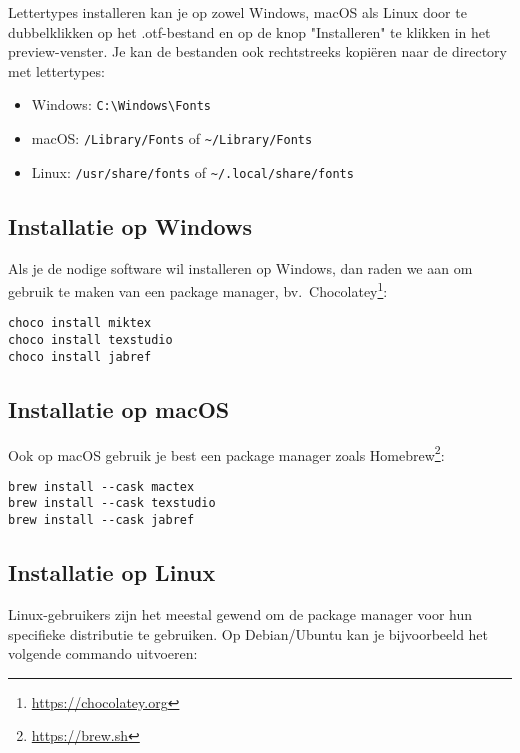 Lettertypes installeren kan je op zowel Windows, macOS als Linux door te dubbelklikken op het .otf-bestand en op de knop "Installeren" te klikken in het preview-venster. Je kan de bestanden ook rechtstreeks kopiëren naar de directory met lettertypes:

\begin{itemize}
  \item Windows: \verb+C:\Windows\Fonts+
  \item macOS: \verb+/Library/Fonts+ of \verb+~/Library/Fonts+
  \item Linux: \verb+/usr/share/fonts+ of \verb+~/.local/share/fonts+
\end{itemize}

\subsection{Installatie op Windows}%
\label{ssec:installatie-op-windows}

Als je de nodige software wil installeren op Windows, dan raden we aan om gebruik te maken van een package manager, bv.\ Chocolatey\footnote{\url{https://chocolatey.org}}:

\begin{verbatim}
choco install miktex
choco install texstudio
choco install jabref
\end{verbatim}

\subsection{Installatie op macOS}%
\label{ssec:installatie-op-macos}

Ook op macOS gebruik je best een package manager zoals Homebrew\footnote{\url{https://brew.sh}}:

\begin{verbatim}
brew install --cask mactex
brew install --cask texstudio
brew install --cask jabref
\end{verbatim}

\subsection{Installatie op Linux}%
\label{ssec:installatie-op-linux}

Linux-gebruikers zijn het meestal gewend om de package manager voor hun specifieke distributie te gebruiken. Op Debian/Ubuntu kan je bijvoorbeeld het volgende commando uitvoeren:

